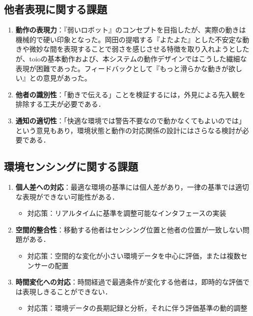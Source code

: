 \documentclass{cuxarticle}
\begin{document}
\subsection{他者表現に関する課題}
\begin{enumerate}
  \item \textbf{動作の表現力}：『弱いロボット』のコンセプトを目指したが、実際の動きは機械的で硬い印象となった。岡田の提唱する『よたよた』とした不安定な動きや微妙な間を表現することで弱さを感じさせる特徴を取り入れようとしたが、toioの基本動作および、本システムの動作デザインではこうした繊細な表現が困難であった。フィードバックとして『もっと滑らかな動きが欲しい』との意見があった。

  \item \textbf{他者の識別性}：「動きで伝える」ことを検証するには，外見による先入観を排除する工夫が必要である．

  \item \textbf{通知の適切性}：「快適な環境では警告不要なので動かなくてもよいのでは」という意見もあり，環境状態と動作の対応関係の設計にはさらなる検討が必要である．
\end{enumerate}

\subsection{環境センシングに関する課題}
\begin{enumerate}
  \item \textbf{個人差への対応}：最適な環境の基準には個人差があり，一律の基準では適切な表現ができない可能性がある．
    \begin{itemize}
      \item 対応策：リアルタイムに基準を調整可能なインタフェースの実装
    \end{itemize}

  \item \textbf{空間的整合性}：移動する他者はセンシング位置と他者の位置が一致しない問題がある．
    \begin{itemize}
      \item 対応策：空間的な変化が小さい環境データを中心に評価，または複数センサーの配置
    \end{itemize}

  \item \textbf{時間変化への対応}：時間経過で最適条件が変化する他者は，即時的な評価では表現しきることができない．
    \begin{itemize}
      \item 対応策：環境データの長期記録と分析，それに伴う評価基準の動的調整
    \end{itemize}
\end{enumerate}
\end{document}
